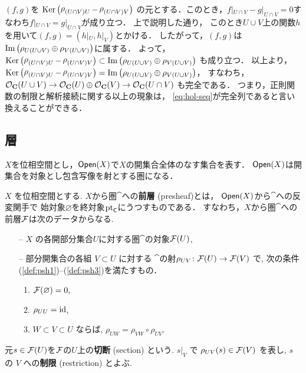 $(f,g)$を
$\mathop{\mathrm{Ker}}\nolimits\left(\mathop{\rho}\nolimits_{(U\cap V)U}-\mathop{\rho}\nolimits_{(U\cap V)V}\right)$
の元とする．このとき，$f|_{U\cap V}-g|_{U\cap V}=0$すなわち$f|_{U\cap V}=g|_{U\cap V}$が成り立つ．
上で説明した通り，
このとき$U\cup V$上の関数$h$を用いて$(f,g)=(h|_U,h|_V)$とかける．
したがって，$(f,g)$は$\mathop{\mathrm{Im}}\nolimits\left(\rho_{U(U\cup V)}\oplus\rho_{V(U\cup V)}\right)$に属する．
よって，
$\mathop{\mathrm{Ker}}\nolimits\left(\mathop{\rho}\nolimits_{(U\cap V)U}-\mathop{\rho}\nolimits_{(U\cap V)V}\right)\subset\mathop{\mathrm{Im}}\nolimits\left(\rho_{U(U\cup V)}\oplus\rho_{V(U\cup V)}\right)$
も成り立つ．
以上より，
$\mathop{\mathrm{Ker}}\nolimits\left(\mathop{\rho}\nolimits_{(U\cap V)U}-\mathop{\rho}\nolimits_{(U\cap V)V}\right)=\mathop{\mathrm{Im}}\nolimits\left(\rho_{U(U\cup V)}\oplus\rho_{V(U\cup V)}\right)$，
すなわち，
$\mathcal{O}_{\mathbf{C}}(U\cup V)\to\mathcal{O}_{\mathbf{C}}(U)\oplus\mathcal{O}_{\mathbf{C}}(V)\to\mathcal{O}_{\mathbf{C}}(U\cap V)$
も完全である．
つまり，正則関数の制限と解析接続に関する以上の現象は，
\eqref{eq:hol-seq}が完全列であると言い換えることができる．

\subsection{層}
$X$を位相空間とし，$\mathop{\textsf{Open}}\nolimits(X)$で$X$の開集合全体のなす集合を表す．
$\mathop{\textsf{Open}}\nolimits(X)$は開集合を対象とし包含写像を射とする圏になる．

\begin{Definition}\label{def-psh}
    $X$ を位相空間とする. 
    $X$から圏$\cat$への\textbf{前層} (presheaf)とは， 
    $\mathop{\textsf{Open}}\nolimits(X)$から$\cat$への反変関手で
    始対象$\varnothing$を終対象$\mathop{\mathrm{pt}}\nolimits_{\textsf{C}}$にうつすものである．
    すなわち，$X$から圏$\cat$への前層$\mathcal{F}$は次のデータからなる. 
    \begin{itemize}
        \item[--] $X$ の各開部分集合$U$に対する圏$\cat$の対象$\mathcal{F}(U)$,
        \item[--] 部分開集合の各組 $V \subset U$ に対する
        $\cat$の射$\rho_{UV} \colon \mathcal{F}(U)\to \mathcal{F}(V)$
        で, 次の条件(\ref{def:psh1})--(\ref{def:psh3})を満たすもの．
        \begin{enumerate}
            \renewcommand{\labelenumi}{({\arabic{enumi}})}
            \item $\mathcal{F}(\varnothing) = 0,$\label{def:psh1} 
            \item $\rho_{UU} = \mathop{\mathrm{id}}\nolimits$, \label{def:psh2}
            \item $W \subset V \subset U$ ならば, \label{def:psh3}
            $\rho_{UW} = \rho_{VW} \circ \rho_{UV}$.
        \end{enumerate}
    \end{itemize}
    元$s\in \mathcal{F}(U)$を$\mathcal{F}$の$U$上の\textbf{切断} (section) という. 
    $s|_V$ で $\rho_{UV}(s)\in\mathcal{F}(V)$ を表し, 
    $s$ の $V$ への\textbf{制限} (restriction) とよぶ. 
\end{Definition}

